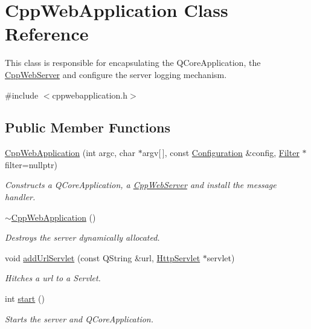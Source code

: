 \hypertarget{class_cpp_web_application}{}\section{Cpp\+Web\+Application Class Reference}
\label{class_cpp_web_application}


This class is responsible for encapsulating the Q\+Core\+Application, the \hyperlink{class_cpp_web_server}{Cpp\+Web\+Server} and configure the server logging mechanism.  




{\ttfamily \#include $<$cppwebapplication.\+h$>$}

\subsection*{Public Member Functions}
\begin{DoxyCompactItemize}
\item 
\hyperlink{class_cpp_web_application_aeb4743e2dce64d0f23b5efd8e5933e27}{Cpp\+Web\+Application} (int argc, char $\ast$argv\mbox{[}$\,$\mbox{]}, const \hyperlink{class_configuration}{Configuration} \&config, \hyperlink{class_filter}{Filter} $\ast$filter=nullptr)
\begin{DoxyCompactList}\small\item\em Constructs a Q\+Core\+Application, a \hyperlink{class_cpp_web_server}{Cpp\+Web\+Server} and install the message handler. \end{DoxyCompactList}\item 
\hyperlink{class_cpp_web_application_a96a7655a25d2e35ed545cdb7b8d81cc5}{$\sim$\+Cpp\+Web\+Application} ()
\begin{DoxyCompactList}\small\item\em Destroys the server dynamically allocated. \end{DoxyCompactList}\item 
void \hyperlink{class_cpp_web_application_aa8c0b5330f0133fc478b921f2a05dcec}{add\+Url\+Servlet} (const Q\+String \&url, \hyperlink{class_http_servlet}{Http\+Servlet} $\ast$servlet)
\begin{DoxyCompactList}\small\item\em Hitches a url to a Servlet. \end{DoxyCompactList}\item 
int \hyperlink{class_cpp_web_application_a1e9f2c789934748d6b7c29ad33e9d7c9}{start} ()
\begin{DoxyCompactList}\small\item\em Starts the server and Q\+Core\+Application. \end{DoxyCompactList}\end{DoxyCompactItemize}


